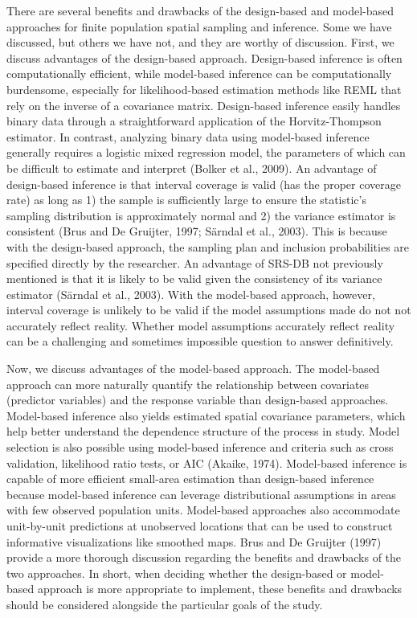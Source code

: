 \documentclass[]{elsarticle} %
\begin{document}
There are several benefits and drawbacks of the design-based and
model-based approaches for finite population spatial sampling and
inference. Some we have discussed, but others we have not, and they are
worthy of discussion. First, we discuss advantages of the design-based
approach. Design-based inference is often computationally efficient,
while model-based inference can be computationally burdensome,
especially for likelihood-based estimation methods like REML that rely
on the inverse of a covariance matrix. Design-based inference easily
handles binary data through a straightforward application of the
Horvitz-Thompson estimator. In contrast, analyzing binary data using
model-based inference generally requires a logistic mixed regression
model, the parameters of which can be difficult to estimate and
interpret (Bolker et al., 2009). An advantage of design-based inference
is that interval coverage is valid (has the proper coverage rate) as
long as 1) the sample is sufficiently large to ensure the statistic's
sampling distribution is approximately normal and 2) the variance
estimator is consistent (Brus and De Gruijter, 1997; Särndal et al.,
2003). This is because with the design-based approach, the sampling plan
and inclusion probabilities are specified directly by the researcher. An
advantage of SRS-DB not previously mentioned is that it is likely to be
valid given the consistency of its variance estimator (Särndal et al.,
2003). With the model-based approach, however, interval coverage is
unlikely to be valid if the model assumptions made do not not accurately
reflect reality. Whether model assumptions accurately reflect reality
can be a challenging and sometimes impossible question to answer
definitively.

Now, we discuss advantages of the model-based approach. The model-based
approach can more naturally quantify the relationship between covariates
(predictor variables) and the response variable than design-based
approaches. Model-based inference also yields estimated spatial
covariance parameters, which help better understand the dependence
structure of the process in study. Model selection is also possible
using model-based inference and criteria such as cross validation,
likelihood ratio tests, or AIC (Akaike, 1974). Model-based inference is
capable of more efficient small-area estimation than design-based
inference because model-based inference can leverage distributional
assumptions in areas with few observed population units. Model-based
approaches also accommodate unit-by-unit predictions at unobserved
locations that can be used to construct informative visualizations like
smoothed maps. Brus and De Gruijter (1997) provide a more thorough
discussion regarding the benefits and drawbacks of the two approaches.
In short, when deciding whether the design-based or model-based approach
is more appropriate to implement, these benefits and drawbacks should be
considered alongside the particular goals of the study.
\end{document}
